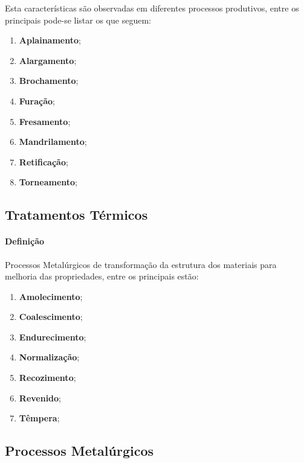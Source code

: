 \documentclass{article}
\begin{document}
            Esta características são observadas em diferentes processos produtivos, entre os principais pode-se listar os que seguem:
                \begin{enumerate}[rightmargin = \leftmargin, noitemsep]
                    \item \textbf{Aplainamento}; 
                    \item \textbf{Alargamento}; 
                    \item \textbf{Brochamento}; 
                    \item \textbf{Furação}; 
                    \item \textbf{Fresamento}; 
                    \item \textbf{Mandrilamento}; 
                    \item \textbf{Retificação}; 
                    \item \textbf{Torneamento}; 
                \end{enumerate}

        \subsection{Tratamentos Térmicos}
            \paragraph{Definição}Processos Metalúrgicos de transformação da estrutura dos materiais para melhoria das propriedades, entre os principais estão:
                \begin{enumerate}[rightmargin = \leftmargin, noitemsep]
                    \item \textbf{Amolecimento};
                    \item \textbf{Coalescimento};
                    \item \textbf{Endurecimento};
                    \item \textbf{Normalização};
                    \item \textbf{Recozimento};
                    \item \textbf{Revenido};
                    \item \textbf{Têmpera};
                \end{enumerate}

        \subsection{Processos Metalúrgicos}
\end{document}
